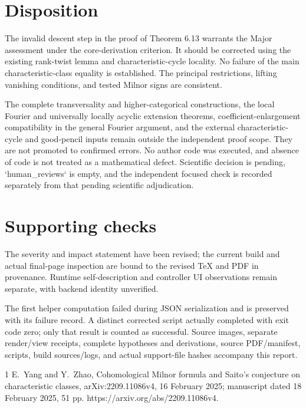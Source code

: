\documentclass[10pt]{article}
\begin{document}
\section*{Disposition}
The invalid descent step in the proof of Theorem 6.13 warrants the Major assessment under the core-derivation criterion. It should be corrected using the existing rank-twist lemma and characteristic-cycle locality. No failure of the main characteristic-class equality is established. The principal restrictions, lifting vanishing conditions, and tested Milnor signs are consistent.\par
The complete transversality and higher-categorical constructions, the local Fourier and universally locally acyclic extension theorems, coefficient-enlargement compatibility in the general Fourier argument, and the external characteristic-cycle and good-pencil inputs remain outside the independent proof scope. They are not promoted to confirmed errors. No author code was executed, and absence of code is not treated as a mathematical defect. Scientific decision is pending, `human\_reviews` is empty, and the independent focused check is recorded separately from that pending scientific adjudication.\par
\section*{Supporting checks}
The severity and impact statement have been revised; the current build and actual final-page inspection are bound to the revised TeX and PDF in provenance. Runtime self-description and controller UI observations remain separate, with backend identity unverified.\par
The first helper computation failed during JSON serialization and is preserved with its failure record. A distinct corrected script actually completed with exit code zero; only that result is counted as successful. Source images, separate render/view receipts, complete hypotheses and derivations, source PDF/manifest, scripts, build sources/logs, and actual support-file hashes accompany this report.\par
1 E. Yang and Y. Zhao, Cohomological Milnor formula and Saito’s conjecture on characteristic classes, arXiv:2209.11086v4, 16 February 2025; manuscript dated 18 February 2025, 51 pp. https://arxiv.org/abs/2209.11086v4.\par
\end{document}
